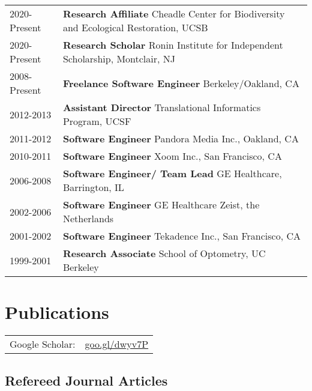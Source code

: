 \documentclass[11pt,fullpage]{article}
\begin{document}
\begin{tabular}{ll}
	2020-Present & {\bf Research Affiliate} Cheadle Center for Biodiversity and Ecological Restoration, UCSB \\
	2020-Present & {\bf Research Scholar} Ronin Institute for Independent Scholarship, Montclair, NJ \\
	2008-Present & {\bf Freelance Software Engineer} Berkeley/Oakland, CA \\
	2012-2013 & {\bf Assistant Director} Translational Informatics Program, UCSF \\ 
        2011-2012 & {\bf Software Engineer} Pandora Media Inc., Oakland, CA \\ 
        2010-2011 & {\bf Software Engineer} Xoom Inc., San Francisco, CA \\
	2006-2008 & {\bf Software Engineer/ Team Lead} GE Healthcare, Barrington, IL \\
	2002-2006 & {\bf Software Engineer} GE Healthcare Zeist, the Netherlands \\
	2001-2002 & {\bf Software Engineer} Tekadence Inc., San Francisco, CA \\ 
	1999-2001 & {\bf Research Associate} School of Optometry, UC Berkeley \\
\end{tabular}

%
\newcommand{\pinfo}[4]{
  {\bf #1} & \multicolumn{2}{l}{\emph{#2}} \\
  & \underline{\href{http://#3}{#3}} & #4 \\
}


\section*{Publications}

\begin{minipage}{0.50\linewidth}
  \begin{tabular}{ll}
    Google Scholar: & \href{https://goo.gl/dwyv7P}{goo.gl/dwyv7P} \\
  \end{tabular}  
\end{minipage}

\subsection*{Refereed Journal Articles}

\setlength{\extrarowheight}{10pt}
\end{document}
